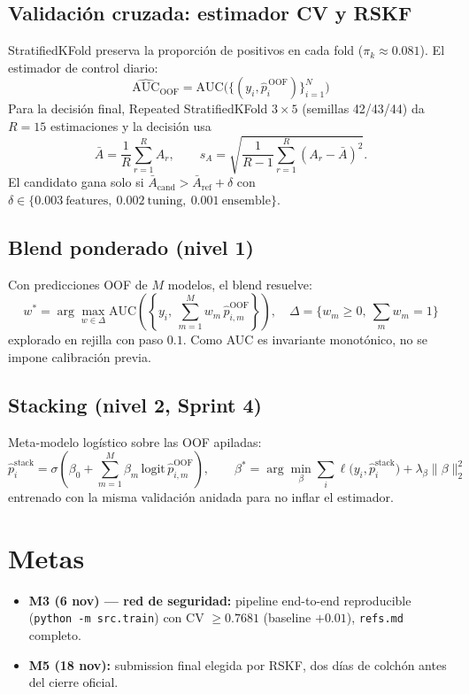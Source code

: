 \documentclass[11pt,a4paper]{article}
\begin{document}
\subsection{Validaci\'on cruzada: estimador CV y RSKF}
StratifiedKFold preserva la proporci\'on de positivos en cada fold
($\pi_k \approx 0.081$). El estimador de control diario:
\begin{equation}
\widehat{\mathrm{AUC}}_{\mathrm{OOF}} = \mathrm{AUC}\big(\{(y_i, \hat{p}_i^{\,\mathrm{OOF}})\}_{i=1}^{N}\big)
\end{equation}
Para la decisi\'on final, Repeated StratifiedKFold $3 \times 5$ (semillas
42/43/44) da $R=15$ estimaciones y la decisi\'on usa
\begin{equation}
\bar{A} = \frac{1}{R}\sum_{r=1}^{R} A_r, \qquad
s_A = \sqrt{\frac{1}{R-1}\sum_{r=1}^{R} (A_r - \bar{A})^2} .
\end{equation}
El candidato gana solo si $\bar{A}_{\text{cand}} > \bar{A}_{\text{ref}} + \delta$
con $\delta \in \{0.003\ \text{features},\ 0.002\ \text{tuning},\ 0.001\
\text{ensemble}\}$.

\subsection{Blend ponderado (nivel 1)}
Con predicciones OOF de $M$ modelos, el blend resuelve:
\begin{equation}
w^* = \arg\max_{w \in \Delta} \mathrm{AUC}\!\left( \left\{ y_i,\ \textstyle\sum_{m=1}^{M} w_m\, \hat{p}_{i,m}^{\mathrm{OOF}} \right\} \right),
\quad \Delta = \{ w_m \ge 0,\ \textstyle\sum_m w_m = 1 \}
\end{equation}
explorado en rejilla con paso $0.1$. Como AUC es invariante monot\'onico, no se
impone calibraci\'on previa.

\subsection{Stacking (nivel 2, Sprint 4)}
Meta-modelo log\'istico sobre las OOF apiladas:
\begin{equation}
\hat{p}_i^{\text{stack}} = \sigma\!\left( \beta_0 + \sum_{m=1}^{M} \beta_m\, \mathrm{logit}\, \hat{p}_{i,m}^{\mathrm{OOF}} \right),
\qquad \beta^* = \arg\min_\beta \sum_i \ell\big(y_i, \hat{p}_i^{\text{stack}}\big) + \lambda_\beta \|\beta\|_2^2
\end{equation}
entrenado con la misma validaci\'on anidada para no inflar el estimador.

\section{Metas}
\begin{itemize}
  \item \textbf{M3 (6 nov) --- red de seguridad:} pipeline end-to-end
        reproducible (\texttt{python -m src.train}) con CV $\geq 0.7681$
        (baseline $+0.01$), \texttt{refs.md} completo.
  \item \textbf{M5 (18 nov):} submission final elegida por RSKF, dos d\'ias de
        colch\'on antes del cierre oficial.
\end{itemize}
\end{document}
